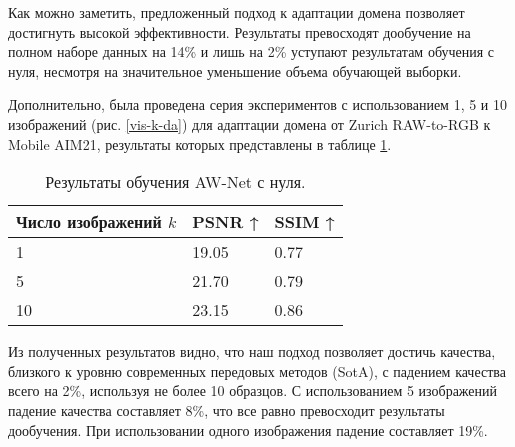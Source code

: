 Как можно заметить, предложенный подход к адаптации домена позволяет достигнуть высокой эффективности. Результаты превосходят дообучение на полном наборе данных на 14\% и лишь на 2\% уступают результатам обучения с нуля, несмотря на значительное уменьшение объема обучающей выборки.


Дополнительно, была проведена серия экспериментов с использованием 1, 5 и 10 изображений (рис. \ref{vis-k-da}) для адаптации домена от Zurich RAW-to-RGB к Mobile AIM21, результаты которых представлены в таблице \ref{tab:k-da}. 

\begin{table}[H]
    \caption{Результаты обучения AW-Net с нуля.}\label{tab:k-da}
    \begin{tabular}{|p{3cm}|p{3cm}|p{3cm}|}
        \hline
        {Число изображений $k$} & {PSNR ↑} & {SSIM ↑} \\
        \hline
        1 & 19.05 & 0.77 \\
        \hline
        5 & 21.70 & 0.79 \\
        \hline
        10 & 23.15 & 0.86  \\
        \hline
    \end{tabular}
\end{table}

Из полученных результатов видно, что наш подход позволяет достичь качества, близкого к уровню современных передовых методов (SotA), с падением качества всего на 2\%, используя не более 10 образцов. С использованием 5 изображений падение качества составляет 8\%, что все равно превосходит результаты дообучения. При использовании одного изображения падение составляет 19\%.

